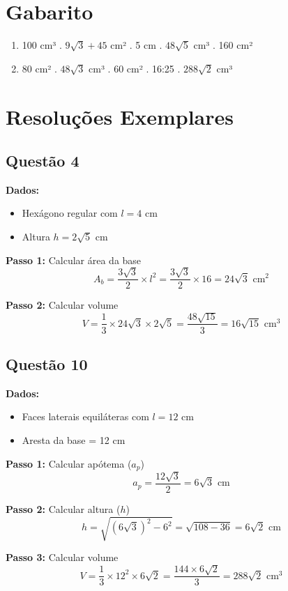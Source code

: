 \documentclass[11pt]{article}
\begin{document}
\begin{multicols}{2}
\section*{Gabarito}
\begin{enumerate}
    \item 100 cm³ . $9\sqrt{3} + 45$ cm² . 5 cm . $48\sqrt{5}$ cm³ . 160 cm²
    
    \item 80 cm² . $48\sqrt{3}$ cm³ . 60 cm² . 16:25 . $288\sqrt{2}$ cm³
\end{enumerate}

\section*{Resoluções Exemplares}
\subsection*{Questão 4}
\textbf{Dados:}
\begin{itemize}[leftmargin=*]
    \item Hexágono regular com $l = 4$ cm
    \item Altura $h = 2\sqrt{5}$ cm
\end{itemize}

\textbf{Passo 1:} Calcular área da base
\[
A_b = \frac{3\sqrt{3}}{2} \times l^2 = \frac{3\sqrt{3}}{2} \times 16 = 24\sqrt{3}\text{ cm}^2
\]

\textbf{Passo 2:} Calcular volume
\[
V = \frac{1}{3} \times 24\sqrt{3} \times 2\sqrt{5} = \frac{48\sqrt{15}}{3} = 16\sqrt{15}\text{ cm}^3
\]

\subsection*{Questão 10}
\textbf{Dados:}
\begin{itemize}[leftmargin=*]
    \item Faces laterais equiláteras com $l = 12$ cm
    \item Aresta da base = 12 cm
\end{itemize}

\textbf{Passo 1:} Calcular apótema ($a_p$)
\[
a_p = \frac{12\sqrt{3}}{2} = 6\sqrt{3}\text{ cm}
\]

\textbf{Passo 2:} Calcular altura ($h$)
\[
h = \sqrt{(6\sqrt{3})^2 - 6^2} = \sqrt{108 - 36} = 6\sqrt{2}\text{ cm}
\]

\textbf{Passo 3:} Calcular volume
\[
V = \frac{1}{3} \times 12^2 \times 6\sqrt{2} = \frac{144 \times 6\sqrt{2}}{3} = 288\sqrt{2}\text{ cm}^3
\]

\end{multicols}
\end{document}

